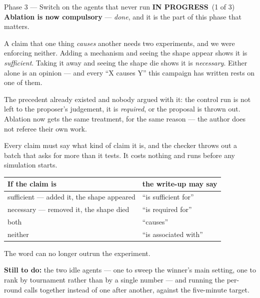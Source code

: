 \documentclass[11pt,a4paper]{article}
\newcommand{\prog}{\textcolor{warn}{\textbf{IN PROGRESS}}}
\begin{document}
\begin{phasebox}{Phase 3 --- Switch on the agents that never run \hfill \prog\ (1 of 3)}
\textbf{Ablation is now compulsory} --- \emph{done}, and it is the part of this phase that matters.

A claim that one thing \emph{causes} another needs two experiments, and we were enforcing neither.
Adding a mechanism and seeing the shape appear shows it is \emph{sufficient}. Taking it away and
seeing the shape die shows it is \emph{necessary}. Either alone is an opinion --- and every ``X
causes Y'' this campaign has written rests on one of them.

The precedent already existed and nobody argued with it: the control run is not left to the
proposer's judgement, it is \emph{required}, or the proposal is thrown out. Ablation now gets the
same treatment, for the same reason --- the author does not referee their own work.

Every claim must say what kind of claim it is, and the checker throws out a batch that asks for
more than it tests. It costs nothing and runs before any simulation starts.

\begin{center}\small
\begin{tabular}{@{}ll@{}}
\toprule
\textbf{If the claim is} & \textbf{the write-up may say}\\
\midrule
sufficient --- added it, the shape appeared  & ``is sufficient for''\\
necessary --- removed it, the shape died     & ``is required for''\\
both                                          & ``causes''\\
neither                                       & ``is associated with''\\
\bottomrule
\end{tabular}
\end{center}

The word can no longer outrun the experiment.

\textbf{Still to do:} the two idle agents --- one to sweep the winner's main setting, one to rank by
tournament rather than by a single number --- and running the per-round calls together instead of
one after another, against the five-minute target.
\end{phasebox}
\end{document}
